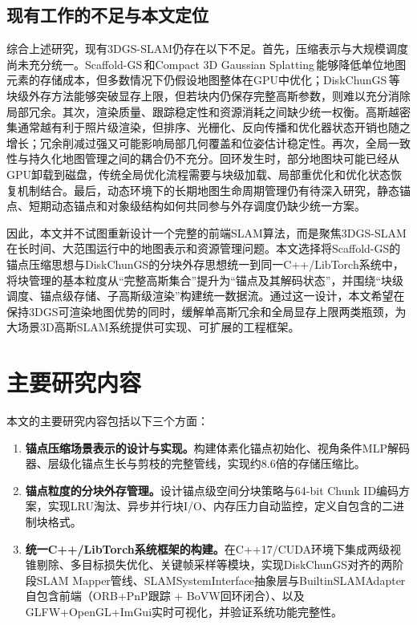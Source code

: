 \subsection{现有工作的不足与本文定位}

综合上述研究，现有3DGS-SLAM仍存在以下不足。首先，压缩表示与大规模调度尚未充分统一。Scaffold-GS\,\cite{lu2024scaffoldgs}和Compact 3D Gaussian Splatting\,\cite{deng2025compact}能够降低单位地图元素的存储成本，但多数情况下仍假设地图整体在GPU中优化；DiskChunGS\,\cite{feldmann2026diskchungs}等块级外存方法能够突破显存上限，但若块内仍保存完整高斯参数，则难以充分消除局部冗余。其次，渲染质量、跟踪稳定性和资源消耗之间缺少统一权衡。高斯越密集通常越有利于照片级渲染，但排序、光栅化、反向传播和优化器状态开销也随之增长；冗余削减过强又可能影响局部几何覆盖和位姿估计稳定性。再次，全局一致性与持久化地图管理之间的耦合仍不充分。回环发生时，部分地图块可能已经从GPU卸载到磁盘，传统全局优化流程需要与块级加载、局部重优化和优化状态恢复机制结合。最后，动态环境下的长期地图生命周期管理仍有待深入研究，静态锚点、短期动态锚点和对象级结构如何共同参与外存调度仍缺少统一方案。

因此，本文并不试图重新设计一个完整的前端SLAM算法，而是聚焦3DGS-SLAM在长时间、大范围运行中的地图表示和资源管理问题。本文选择将Scaffold-GS的锚点压缩思想与DiskChunGS的分块外存思想统一到同一C++/LibTorch系统中，将块管理的基本粒度从“完整高斯集合”提升为“锚点及其解码状态”，并围绕“块级调度、锚点级存储、子高斯级渲染”构建统一数据流。通过这一设计，本文希望在保持3DGS可渲染地图优势的同时，缓解单高斯冗余和全局显存上限两类瓶颈，为大场景3D高斯SLAM系统提供可实现、可扩展的工程框架。

\section{主要研究内容}

本文的主要研究内容包括以下三个方面：

\begin{enumerate}[label=(\arabic*),leftmargin=2em]
    \item \textbf{锚点压缩场景表示的设计与实现。}构建体素化锚点初始化、视角条件MLP解码器、层级化锚点生长与剪枝的完整管线，实现约8.6倍的存储压缩比。
    \item \textbf{锚点粒度的分块外存管理。}设计锚点级空间分块策略与64-bit Chunk ID编码方案，实现LRU淘汰、异步并行块I/O、内存压力自动监控，定义自包含的\schun 二进制块格式。
    \item \textbf{统一C++/LibTorch系统框架的构建。}在C++17/CUDA环境下集成两级视锥剔除、多目标损失优化、关键帧采样等模块，实现DiskChunGS对齐的两阶段SLAM Mapper管线、SLAMSystemInterface抽象层与BuiltinSLAMAdapter自包含前端（ORB+PnP跟踪 + BoVW回环闭合）、以及GLFW+OpenGL+ImGui实时可视化，并验证系统功能完整性。
\end{enumerate}

